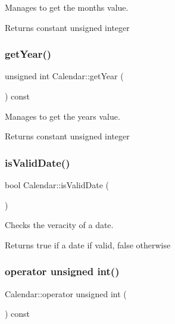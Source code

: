Manages to get the month\textquotesingle{}s value. 

\begin{DoxyReturn}{Returns}
constant unsigned integer 
\end{DoxyReturn}
\mbox{\label{class_calendar_aae56d627c0f61f70fdae96e816152bd7}} 
\subsubsection{\texorpdfstring{get\+Year()}{getYear()}}
{\footnotesize\ttfamily unsigned int Calendar\+::get\+Year (\begin{DoxyParamCaption}{ }\end{DoxyParamCaption}) const}



Manages to get the year\textquotesingle{}s value. 

\begin{DoxyReturn}{Returns}
constant unsigned integer 
\end{DoxyReturn}
\mbox{\label{class_calendar_a5b30c644c6a7bf69c541c14fc7c4e47d}} 
\subsubsection{\texorpdfstring{is\+Valid\+Date()}{isValidDate()}}
{\footnotesize\ttfamily bool Calendar\+::is\+Valid\+Date (\begin{DoxyParamCaption}{ }\end{DoxyParamCaption})}



Checks the veracity of a date. 

\begin{DoxyReturn}{Returns}
true if a date if valid, false otherwise 
\end{DoxyReturn}
\mbox{\label{class_calendar_a70f6e6b4f62dcca5c05bd9341d288b0a}} 
\subsubsection{\texorpdfstring{operator unsigned int()}{operator unsigned int()}}
{\footnotesize\ttfamily Calendar\+::operator unsigned int (\begin{DoxyParamCaption}{ }\end{DoxyParamCaption}) const}

